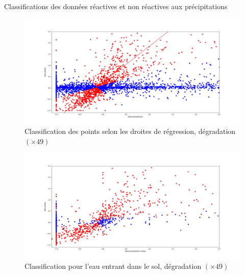\documentclass{beamer}
\numberwithin{equation}{section}
\begin{document}
	\begin{frame}{Classifications des données réactives et non réactives aux précipitations}
	\begin{minipage}[b]{0.5\linewidth}
		\begin{figure}[H]
			\label{points}
			\begin{center}
				\includegraphics[scale=0.12]{images/classification_deb_pr.png}
				\end{center}
				\caption{Classification des points selon les droites de régression, dégradation $(\times 49)$}
			\end{figure}
		\end{minipage}\hfill
		\begin{minipage}[b]{0.5\linewidth}
			\begin{figure}[H]
				\label{points-2}
				\begin{center}
					\includegraphics[scale=0.12]{images/classification_deb_prr.png}
					\end{center}
					\caption{Classification pour l'eau entrant dans le sol, dégradation $(\times 49)$}
				\end{figure}
			\end{minipage}
		\end{frame}
	
\end{document}
